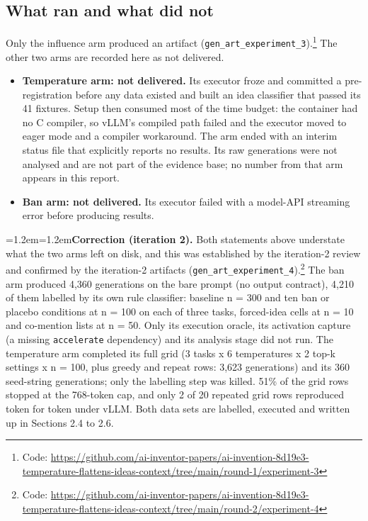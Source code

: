\documentclass[11pt,letterpaper]{article}
\newenvironment{correction}{\par\medskip\noindent\begin{minipage}{\linewidth}\small\leftskip=1.2em\rightskip=1.2em\noindent}{\end{minipage}\par\medskip}
\begin{document}
\subsection{What ran and what did not}
Only the influence arm produced an artifact (\texttt{gen\_\allowbreak{}art\_\allowbreak{}experiment\_\allowbreak{}3}).\footnote{Code: \url{https://github.com/ai-inventor-papers/ai-invention-8d19e3-temperature-flattens-ideas-context/tree/main/round-1/experiment-3}} The other two arms are recorded here as not delivered.

\begin{itemize}
\item \textbf{Temperature arm: not delivered.} Its executor froze and committed a pre-registration before any data existed and built an idea classifier that passed its 41 fixtures. Setup then consumed most of the time budget: the container had no C compiler, so vLLM's compiled path failed and the executor moved to eager mode and a compiler workaround. The arm ended with an interim status file that explicitly reports no results. Its raw generations were not analysed and are not part of the evidence base; no number from that arm appears in this report.
\item \textbf{Ban arm: not delivered.} Its executor failed with a model-API streaming error before producing results.
\end{itemize}
\begin{correction}\textbf{Correction (iteration 2).} Both statements above understate what the two arms left on disk, and this was established by the iteration-2 review and confirmed by the iteration-2 artifacts (\texttt{gen\_\allowbreak{}art\_\allowbreak{}experiment\_\allowbreak{}4}).\footnote{Code: \url{https://github.com/ai-inventor-papers/ai-invention-8d19e3-temperature-flattens-ideas-context/tree/main/round-2/experiment-4}} The ban arm produced 4,360 generations on the bare prompt (no output contract), 4,210 of them labelled by its own rule classifier: baseline n = 300 and ten ban or placebo conditions at n = 100 on each of three tasks, forced-idea cells at n = 10 and co-mention lists at n = 50. Only its execution oracle, its activation capture (a missing \texttt{accelerate} dependency) and its analysis stage did not run. The temperature arm completed its full grid (3 tasks x 6 temperatures x 2 top-k settings x n = 100, plus greedy and repeat rows: 3,623 generations) and its 360 seed-string generations; only the labelling step was killed. 51\% of the grid rows stopped at the 768-token cap, and only 2 of 20 repeated grid rows reproduced token for token under vLLM. Both data sets are labelled, executed and written up in Sections 2.4 to 2.6.\end{correction}
\end{document}
